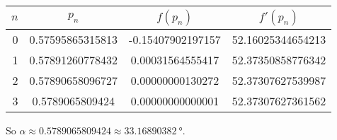 \documentclass[../../../../Assignments]{subfiles}
\begin{document}
\begin{solution}
\begin{enumerate}[label = \alph*)]
            \begin{table}[H]
                \centering
                \begin{tabular}{r S[table-format=1.14] S[table-format=-1.14] S[table-format=2.14]}
                    \toprule
                    \(n\)  &      {\(p_n\)}     &     {\(f(p_n)\)}    &    {\(f'(p_n)\)}    \\
                      &  0.57595865315813  &  -0.15407902197157  &  52.16025344654213  \\
                        1  &  0.57891260778432  &   0.00031564555417  &  52.37350858776342  \\
                        2  &  0.57890658096727  &   0.00000000130272  &  52.37307627539987  \\
                        3  &  0.5789065809424   &   0.00000000000001  &  52.37307627361562  \\
                    \bottomrule
                \end{tabular}
            \end{table}

            So \(\alpha \approx \num{0.5789065809424} \approx
            \SI{33.16890382}{\degree}\).
    \end{enumerate}
\end{solution}
\end{document}
